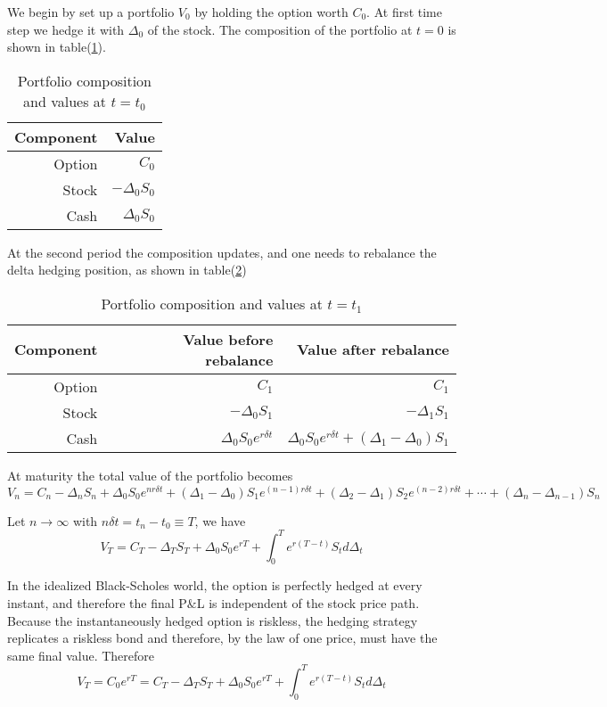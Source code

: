\documentclass[10pt]{article}
\theoremstyle{plain}
\numberwithin{equation}{section}
\numberwithin{table}{section}
\newcommand{\de}{\delta}
\begin{document}
We begin by set up a portfolio $V_0$ by holding the option worth $C_0$. At first time step we hedge it with $\Delta_0$ of the stock. The composition of the portfolio at $t=0$ is shown in table(\ref{table_hedging_ptf_0}). 

\begin{table}[H]
    \centering
    \begin{tabular}{|rr|}
    \hline Component & Value\\
    \hline Option&$C_{0}$\\
        Stock& $-\Delta_0 S_{0}$\\
        Cash&$\Delta_0 S_{0}$\\
    \hline
    \end{tabular}\caption{Portfolio composition and values at $t=t_0$}
    \label{table_hedging_ptf_0}
\end{table}

At the second period the composition updates, and one needs to rebalance the delta hedging position, as shown in table(\ref{table_hedging_ptf_1}) 
\begin{table}[H]
    \centering
    \begin{tabular}{|rrr|}
    \hline Component & Value before rebalance & Value after rebalance \\
    \hline Option  &   $C_{1}$                & $C_{1}$  \\ 
        Stock      & $-\Delta_0 S_{1}$        & $-\Delta_1 S_{1}$\\
        Cash      & $\Delta_0 S_0e^{r\de t}$ & $\Delta_0 S_0e^{r\de t}+(\Delta_1-\Delta_0)S_1$ \\
    \hline
    \end{tabular}\caption{Portfolio composition and values at $t=t_1$}
    \label{table_hedging_ptf_1}
\end{table}

At maturity the total value of the portfolio becomes
\[
    V_n = C_n -\Delta_n S_n +\Delta_0 S_0 e^{nr\de t}+(\Delta_1-\Delta_0)S_1 e^{(n-1)r\de t}+(\Delta_2-\Delta_1)S_2 e^{(n-2)r\de t}+ \cdots + (\Delta_n-\Delta_{n-1})S_n
\]

Let $n \rightarrow \infty$ with $n \de t = t_n-t_0 \equiv T$, we have 
\[
    V_T = C_T -\Delta_TS_T +\Delta_0S_0 e^{rT} + \int_0^T  e^{r(T-t)}S_t d\Delta_t   
\]

In the idealized Black-Scholes world, the option is perfectly hedged at every instant,
and therefore the final P$\&$L is independent of the stock price path. Because
the instantaneously hedged option is riskless, the hedging strategy replicates
a riskless bond and therefore, by the law of one price, must have the same
final value. Therefore
\[
    V_T = C_0e^{rT} = C_T -\Delta_TS_T +\Delta_0S_0 e^{rT} + \int_0^T  e^{r(T-t)}S_t d\Delta_t        
\]
\end{document}
